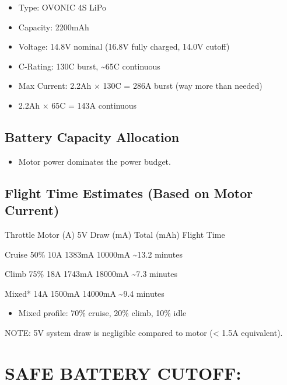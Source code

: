 \documentclass[11pt,letterpaper]{article}
\begin{document}
\begin{itemize}
  \item Type:         OVONIC 4S LiPo
  \item Capacity:     2200mAh
  \item Voltage:      14.8V nominal (16.8V fully charged, 14.0V cutoff)
  \item C-Rating:     130C burst, \textasciitilde{}65C continuous
  \item Max Current:  2.2Ah $\times$ 130C = 286A burst (way more than needed)
  \item 2.2Ah $\times$ 65C = 143A continuous
\end{itemize}

\subsection{Battery Capacity Allocation}

\begin{itemize}
  \item Motor power dominates the power budget.
\end{itemize}

\subsection{Flight Time Estimates (Based on Motor Current)}

Throttle    Motor (A)   5V Draw (mA)   Total (mAh)   Flight Time\par

Cruise 50\%    10A         1383mA         10000mA      \textasciitilde{}13.2 minutes\par

Climb 75\%     18A         1743mA         18000mA       \textasciitilde{}7.3 minutes\par

Mixed*        14A         1500mA         14000mA      \textasciitilde{}9.4 minutes\par

\begin{itemize}
  \item Mixed profile: 70\% cruise, 20\% climb, 10\% idle
\end{itemize}

NOTE: 5V system draw is negligible compared to motor (< 1.5A equivalent).\par

\section{SAFE BATTERY CUTOFF:}
\end{document}
